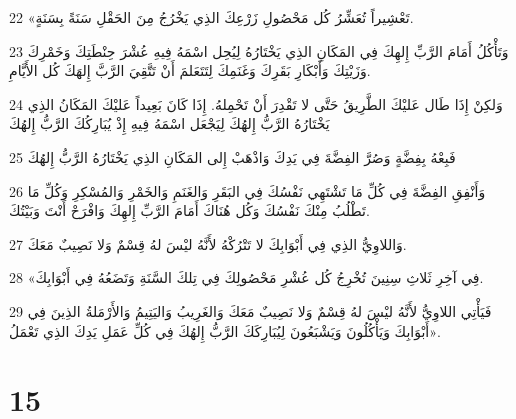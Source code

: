 \par 22 «تَعْشِيراً تُعَشِّرُ كُل مَحْصُولِ زَرْعِكَ الذِي يَخْرُجُ مِنَ الحَقْلِ سَنَةً بِسَنَةٍ.
\par 23 وَتَأْكُلُ أَمَامَ الرَّبِّ إِلهِكَ فِي المَكَانِ الذِي يَخْتَارُهُ لِيُحِل اسْمَهُ فِيهِ عُشْرَ حِنْطَتِكَ وَخَمْرِكَ وَزَيْتِكَ وَأَبْكَارِ بَقَرِكَ وَغَنَمِكَ لِتَتَعَلمَ أَنْ تَتَّقِيَ الرَّبَّ إِلهَكَ كُل الأَيَّامِ.
\par 24 وَلكِنْ إِذَا طَال عَليْكَ الطَّرِيقُ حَتَّى لا تَقْدِرَ أَنْ تَحْمِلهُ. إِذَا كَانَ بَعِيداً عَليْكَ المَكَانُ الذِي يَخْتَارُهُ الرَّبُّ إِلهُكَ لِيَجْعَل اسْمَهُ فِيهِ إِذْ يُبَارِكُكَ الرَّبُّ إِلهُكَ
\par 25 فَبِعْهُ بِفِضَّةٍ وَصُرَّ الفِضَّةَ فِي يَدِكَ وَاذْهَبْ إِلى المَكَانِ الذِي يَخْتَارُهُ الرَّبُّ إِلهُكَ
\par 26 وَأَنْفِقِ الفِضَّةَ فِي كُلِّ مَا تَشْتَهِي نَفْسُكَ فِي البَقَرِ وَالغَنَمِ وَالخَمْرِ وَالمُسْكِرِ وَكُلِّ مَا تَطْلُبُ مِنْكَ نَفْسُكَ وَكُل هُنَاكَ أَمَامَ الرَّبِّ إِلهِكَ وَافْرَحْ أَنْتَ وَبَيْتُكَ.
\par 27 وَاللاوِيُّ الذِي فِي أَبْوَابِكَ لا تَتْرُكْهُ لأَنَّهُ ليْسَ لهُ قِسْمٌ وَلا نَصِيبٌ مَعَكَ.
\par 28 «فِي آخِرِ ثَلاثِ سِنِينَ تُخْرِجُ كُل عُشْرِ مَحْصُولِكَ فِي تِلكَ السَّنَةِ وَتَضَعُهُ فِي أَبْوَابِكَ.
\par 29 فَيَأْتِي اللاوِيُّ لأَنَّهُ ليْسَ لهُ قِسْمٌ وَلا نَصِيبٌ مَعَكَ وَالغَرِيبُ وَاليَتِيمُ وَالأَرْمَلةُ الذِينَ فِي أَبْوَابِكَ وَيَأْكُلُونَ وَيَشْبَعُونَ لِيُبَارِكَكَ الرَّبُّ إِلهُكَ فِي كُلِّ عَمَلِ يَدِكَ الذِي تَعْمَلُ».

\chapter{15}

